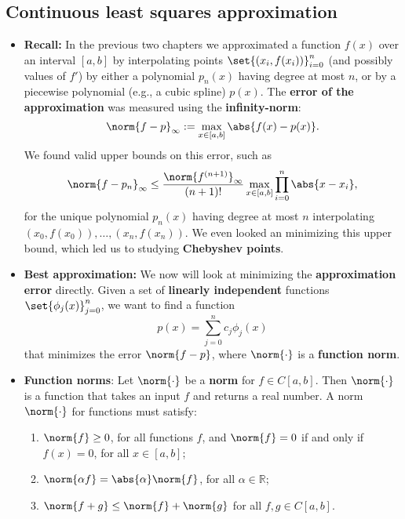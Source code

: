 \documentclass{report}
\begin{document}
     \subsection{Continuous least squares approximation}
     \begin{itemize}
         \item \textbf{Recall:} 
             In the previous two chapters we approximated a function $f(x)$ over an interval $[a,b]$ by interpolating points $\set{(x_i,f(x_i))}_{i=0}^n$ (and possibly values of $f'$) by either a polynomial $p_n(x)$ having degree at most $n$, or by a piecewise polynomial (e.g., a cubic spline) $p(x)$.
             \bigbreak \noindent 
             The \textbf{error of the approximation} was measured using the \textbf{infinity-norm}:
             $$
             \norm{f - p}_\infty := \max_{x \in [a,b]} \abs{f(x) - p(x)}.$$
             We found valid upper bounds on this error, such as 
             $$\norm{f - p_n}_\infty \leq \frac{\norm{f^{(n+1)}}_\infty}{(n+1)!} \max_{x \in [a,b]} \prod_{i=0}^n \abs{x-x_i},$$
             for the unique polynomial $p_n(x)$ having degree at most $n$ interpolating $(x_0,f(x_0)), \ldots, (x_n,f(x_n))$.
             \bigbreak \noindent 
             We even looked an minimizing this upper bound, which led us to studying \textbf{Chebyshev points}.
         \item \textbf{Best approximation:} We now will look at minimizing the \textbf{approximation error} directly. 
             Given a set of \textbf{linearly independent} functions $\set{\phi_j(x)}_{j=0}^n$, we want to find a function 
             $$p(x) = \sum_{j=0}^n c_j \phi_j(x)$$
             that minimizes the error $\norm{f - p}$, where $\norm{\cdot}$ is a \textbf{function norm}.
         \item \textbf{Function norms}:
             Let $\norm{\cdot}$ be a \textbf{norm} for $f \in C[a,b]$.
             \bigbreak \noindent 
             Then $\norm{\cdot}$ is a function that takes an input $f$ and returns a real number.
             \bigbreak \noindent 
             A norm $\norm{\cdot}$ for functions must satisfy:
             \begin{enumerate}
                 \item $\norm{f} \geq 0$, for all functions $f$, and $\norm{f} = 0$ if and only if $f(x) = 0$, for all $x \in [a,b]$;
                 \item $\norm{\alpha f} = \abs{\alpha} \norm{f}$, for all $\alpha \in \mathbb{R}$;
                 \item $\norm{f+g} \leq \norm{f} + \norm{g}$ for all $f, g \in C[a,b]$.

\end{enumerate}
\end{itemize}
\end{document}
